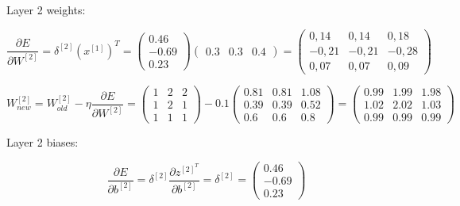 \documentclass{article}
\begin{document}
\begin{enumerate}[leftmargin=\labelsep]
Layer 2 weights:

\begin{equation*}
  \frac{\partial E}{\partial W^{[2]}} = \delta^{[2]} (x^{[1]})^T =
  \begin{pmatrix}
    0.46 \\
    -0.69 \\
    0.23
    \end{pmatrix}
    \begin{pmatrix}
      0.3 & 0.3 & 0.4
      \end{pmatrix} =
      \begin{pmatrix}
        0,14  & 0,14  & 0,18  \\
        -0,21 & -0,21 & -0,28 \\
        0,07  & 0,07  & 0,09
      \end{pmatrix}
\end{equation*}

\begin{equation*}
  W^{[2]}_{new} = W^{[2]}_{old} - \eta \frac{\partial E}{\partial W^{[2]}} =
  \begin{pmatrix}
    1 & 2 & 2 \\
    1 & 2 & 1 \\
    1 & 1 & 1
  \end{pmatrix} - 0.1
  \begin{pmatrix}
    0.81 & 0.81 & 1.08 \\
    0.39 & 0.39 & 0.52 \\
    0.6	 & 0.6 &  0.8
    \end{pmatrix} =
    \begin{pmatrix}
      0.99 & 1.99 & 1.98 \\
      1.02 & 2.02 & 1.03 \\
      0.99 & 0.99 & 0.99
      \end{pmatrix}
\end{equation*}


Layer 2 biases:

\begin{equation*}
  \frac{\partial E}{\partial b^{[2]}} =
  \delta^{[2]} \frac{\partial z^{[2]^T}}{\partial b^{[2]}} =
  \delta^{[2]} =
  \begin{pmatrix}
    0.46 \\
    -0.69 \\
    0.23
    \end{pmatrix}
\end{equation*}


\end{enumerate}
\end{document}
